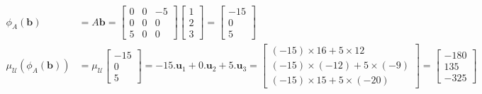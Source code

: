 \documentclass{amsart}
\newcommand{\bsm}       {\left[\begin{smallmatrix}}
\newcommand{\esm}       {\end{smallmatrix}\right]}
\newcommand{\tm}        {\times}
\newcommand{\vb}        {\mathbf{b}}
\newcommand{\vu}        {\mathbf{u}}
\newcommand{\CU}        {{\mathcal{U}}}
\renewcommand{\:}       {\colon}
\theoremstyle{definition}
\renewenvironment{solution}{\SolutionAtEnd}{\endSolutionAtEnd}
\begin{document}
\begin{solution}
\begin{itemize}
\begin{align*}
    \phi_A(\vb) &= A\vb = \bsm 0&0&-5\\ 0&0&0\\ 5&0&0\esm
                          \bsm 1\\ 2\\ 3\esm 
                 = \bsm -15\\ 0\\ 5 \esm \\
    \mu_\CU(\phi_A(\vb)) &= 
     \mu_\CU\bsm -15\\ 0\\ 5\esm =
      -15.\vu_1 + 0.\vu_2 + 5.\vu_3 =
      \bsm (-15)\tm 16 + 5\tm 12 \\
           (-15)\tm(-12) + 5\tm(-9) \\
           (-15)\tm 15 + 5\tm(-20) \esm = 
      \bsm -180 \\ 135 \\ -325 \esm
   \end{align*}
 \end{itemize}
\end{solution}
\end{document}
